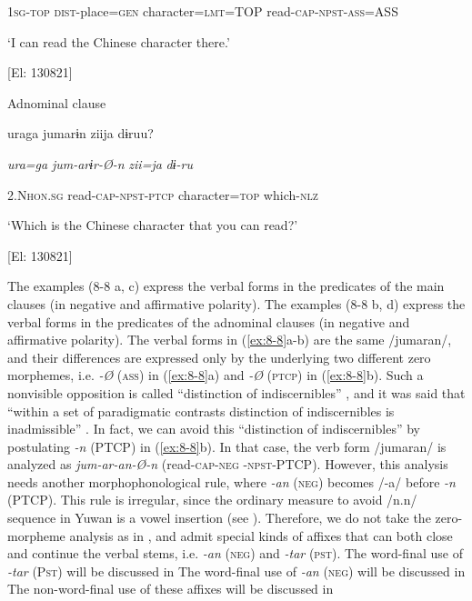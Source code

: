    1\textsc{sg}-\textsc{top}  \textsc{dist}-place=\textsc{gen}  character=\textsc{lmt}=TOP  read-\textsc{cap}-\textsc{npst}-\textsc{ass}=ASS

    ‘I can read the Chinese character there.’

    [El: 130821]

\ex Adnominal clause

    uraga  jumarɨn  ziija  dɨruu?

    \textit{ura=ga}  \textit{jum-arɨr-Ø-n}  \textit{zii=ja}  \textit{dɨ-ru}

    2.N\textsc{hon}.\textsc{sg}  read-\textsc{cap}-\textsc{npst}-\textsc{ptcp}  character=\textsc{top}  which-\textsc{nlz}

    ‘Which is the Chinese character that you can read?’

    [El: 130821]

The examples (8-8 a, c) express the verbal forms in the predicates of the main clauses (in negative and affirmative polarity). The examples (8-8 b, d) express the verbal forms in the predicates of the adnominal clauses (in negative and affirmative polarity). The verbal forms in (\ref{ex:8-8}a-b) are the same /jumaran/, and their differences are expressed only by the underlying two different zero morphemes, i.e. \textit{{}-Ø} (\textsc{ass}) in (\ref{ex:8-8}a) and \textit{{}-Ø} (\textsc{ptcp}) in (\ref{ex:8-8}b). Such a nonvisible opposition is called “distinction of indiscernibles” \citep[36]{Haas1974}, and it was said that “within a set of paradigmatic contrasts distinction of indiscernibles is inadmissible” \citep[83]{McGregor2003}. In fact, we can avoid this “distinction of indiscernibles” by postulating \textit{{}-n} (PTCP) in (\ref{ex:8-8}b). In that case, the verb form /jumaran/ is analyzed as \textit{jum-ar-an-Ø-n} (read-\textsc{cap}-\textsc{neg} -\textsc{npst}-PTCP). However, this analysis needs another morphophonological rule, where \textit{{}-an} (\textsc{neg}) becomes /-a/ before \textit{{}-n} (PTCP). This rule is irregular, since the ordinary measure to avoid /n.n/ sequence in Yuwan is a vowel insertion (see ). Therefore, we do not take the zero-morpheme analysis as in , and admit special kinds of affixes that can both close and continue the verbal stems, i.e. \textit{{}-an} (\textsc{neg}) and \textit{{}-tar} (\textsc{pst}). The word-final use of \textit{{}-tar} (P\textsc{st}) will be discussed in  The word-final use of \textit{{}-an} (\textsc{neg}) will be discussed in  The non-word-final use of these affixes will be discussed in 

